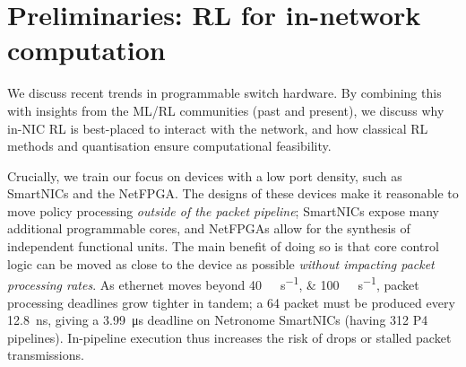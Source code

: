 \documentclass[
sigconf,natbib=false
]{acmart}
\begin{document}
%

\section{Preliminaries: RL for in-network computation}\label{sec:motivation}
We discuss recent trends in programmable switch hardware.
By combining this with insights from the ML/RL communities (past and present), we discuss why in-NIC RL is best-placed to interact with the network, and how classical RL methods and quantisation ensure computational feasibility.

Crucially, we train our focus on devices with a low port density, such as SmartNICs and the NetFPGA.
The designs of these devices make it reasonable to move policy processing \emph{outside of the packet pipeline}; SmartNICs expose many additional programmable cores, and NetFPGAs allow for the synthesis of independent functional units.
The main benefit of doing so is that core control logic can be moved as close to the device as possible \emph{without impacting packet processing rates}.
As ethernet moves beyond \SIlist{40;100}{\giga\bit\per\second}, packet processing deadlines grow tighter in tandem; a \SI{64}{\byte} packet must be produced every \SI{12.8}{\nano\second}, giving a \SI{3.99}{\micro\second} deadline on Netronome SmartNICs (having \num{312} P4 pipelines).
In-pipeline execution thus increases the risk of drops or stalled packet transmissions.


\end{document}
